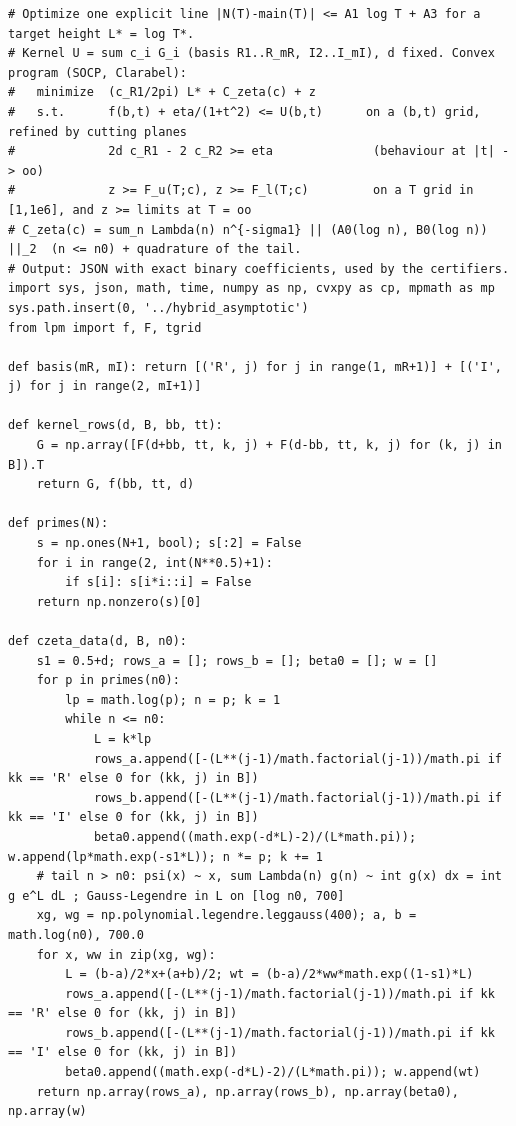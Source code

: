 \documentclass[11pt,reqno]{amsart}
\numberwithin{equation}{section}
\theoremstyle{definition}
\theoremstyle{remark}
\begin{document}
\begin{lstlisting}
# Optimize one explicit line |N(T)-main(T)| <= A1 log T + A3 for a target height L* = log T*.
# Kernel U = sum c_i G_i (basis R1..R_mR, I2..I_mI), d fixed. Convex program (SOCP, Clarabel):
#   minimize  (c_R1/2pi) L* + C_zeta(c) + z
#   s.t.      f(b,t) + eta/(1+t^2) <= U(b,t)      on a (b,t) grid, refined by cutting planes
#             2d c_R1 - 2 c_R2 >= eta              (behaviour at |t| -> oo)
#             z >= F_u(T;c), z >= F_l(T;c)         on a T grid in [1,1e6], and z >= limits at T = oo
# C_zeta(c) = sum_n Lambda(n) n^{-sigma1} || (A0(log n), B0(log n)) ||_2  (n <= n0) + quadrature of the tail.
# Output: JSON with exact binary coefficients, used by the certifiers.
import sys, json, math, time, numpy as np, cvxpy as cp, mpmath as mp
sys.path.insert(0, '../hybrid_asymptotic')
from lpm import f, F, tgrid

def basis(mR, mI): return [('R', j) for j in range(1, mR+1)] + [('I', j) for j in range(2, mI+1)]

def kernel_rows(d, B, bb, tt):
    G = np.array([F(d+bb, tt, k, j) + F(d-bb, tt, k, j) for (k, j) in B]).T
    return G, f(bb, tt, d)

def primes(N):
    s = np.ones(N+1, bool); s[:2] = False
    for i in range(2, int(N**0.5)+1):
        if s[i]: s[i*i::i] = False
    return np.nonzero(s)[0]

def czeta_data(d, B, n0):
    s1 = 0.5+d; rows_a = []; rows_b = []; beta0 = []; w = []
    for p in primes(n0):
        lp = math.log(p); n = p; k = 1
        while n <= n0:
            L = k*lp
            rows_a.append([-(L**(j-1)/math.factorial(j-1))/math.pi if kk == 'R' else 0 for (kk, j) in B])
            rows_b.append([-(L**(j-1)/math.factorial(j-1))/math.pi if kk == 'I' else 0 for (kk, j) in B])
            beta0.append((math.exp(-d*L)-2)/(L*math.pi)); w.append(lp*math.exp(-s1*L)); n *= p; k += 1
    # tail n > n0: psi(x) ~ x, sum Lambda(n) g(n) ~ int g(x) dx = int g e^L dL ; Gauss-Legendre in L on [log n0, 700]
    xg, wg = np.polynomial.legendre.leggauss(400); a, b = math.log(n0), 700.0
    for x, ww in zip(xg, wg):
        L = (b-a)/2*x+(a+b)/2; wt = (b-a)/2*ww*math.exp((1-s1)*L)
        rows_a.append([-(L**(j-1)/math.factorial(j-1))/math.pi if kk == 'R' else 0 for (kk, j) in B])
        rows_b.append([-(L**(j-1)/math.factorial(j-1))/math.pi if kk == 'I' else 0 for (kk, j) in B])
        beta0.append((math.exp(-d*L)-2)/(L*math.pi)); w.append(wt)
    return np.array(rows_a), np.array(rows_b), np.array(beta0), np.array(w)


\end{lstlisting}
\end{document}

